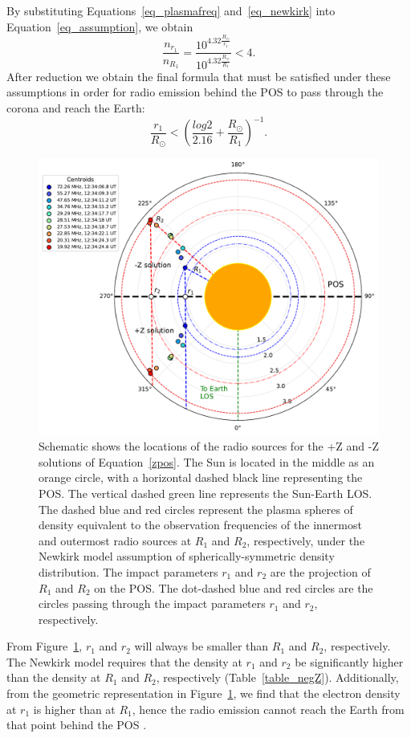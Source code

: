 By substituting Equations~\ref{eq_plasmafreq} and~\ref{eq_newkirk} into Equation~\ref{eq_assumption}, we obtain
\begin{equation}
	\frac{n_{r_1}}{n_{R_1}} = \frac{10^{4.32 \frac{R_\odot}{r_1}}}{10^{4.32 \frac{R_\odot}{R_1}}} < 4.
	\label{eq_condition}
\end{equation}
After reduction we obtain the final formula that must be satisfied under these assumptions in order for radio emission behind the POS to pass through the corona and reach the Earth:
\begin{equation}
	\frac{r_1}{R_\odot} < \left( \frac{log 2}{2.16} + \frac{R_\odot}{R_1} \right)^{-1}.
\end{equation}

\begin{figure}[h!]
	\centering
	\includegraphics[width=0.8\hsize]{chapter3/figs/negZ_posZ_solutions.pdf}
	\caption{Schematic shows the locations of the radio sources for the +Z and -Z solutions of Equation~\ref{zpos}. The Sun is located in the middle as an orange circle, with a horizontal dashed black line representing the POS. The vertical dashed green line represents the Sun-Earth LOS. The dashed blue and red circles represent the plasma spheres of density equivalent to the observation frequencies of the innermost and outermost radio sources at $R_1$ and $R_2$, respectively, under the Newkirk model assumption of spherically-symmetric density distribution. The impact parameters $r_1$ and $r_2$ are the projection of $R_1$ and $R_2$ on the POS. The dot-dashed blue and red circles are the circles passing through the impact parameters $r_1$ and $r_2$, respectively.}
	\label{fig_negZ_posZ}
\end{figure}
From Figure~\ref{fig_negZ_posZ}, $r_1$ and $r_2$ will always be smaller than $R_1$ and $R_2$, respectively. The Newkirk model requires that the density at $r_1$ and $r_2$ be significantly higher than the density at $R_1$ and $R_2$, respectively (Table~\ref{table_negZ}). Additionally, from the geometric representation in Figure~\ref{fig_negZ_posZ}, we find that the electron density at $r_1$ is higher than at ${R_1}$, hence the radio emission cannot reach the Earth from that point behind the POS \citep{mann_2018}.

